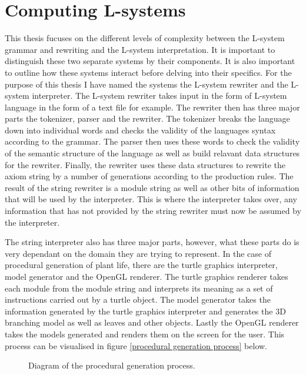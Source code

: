 \section{Computing L-systems}

This thesis fucuses on the different levels of complexity between the L-system grammar and rewriting and the L-system interpretation. It is important to distinguish these two separate systems by their components. It is also important to outline how these systems interact before delving into their specifics. For the purpose of this thesis I have named the systems the L-system rewriter and the L-system interpreter. The L-system rewriter takes input in the form of L-system language in the form of a text file for example. The rewriter then has three major parts the tokenizer, parser and the rewriter. The tokenizer breaks the language down into individual words and checks the validity of the languages syntax according to the grammar. The parser then uses  these words to check the validity of the semantic structure of the language as well as build relavant data structures for the rewriter. Finally, the rewriter uses these data structures to rewrite the axiom string by a number of generations according to the production rules. The result of the string rewriter is a module string as well as other bits of information that will be used by the interpreter. This is where the interpreter takes over, any information that has not provided by the string rewriter must now be assumed by the interpreter. 

The string interpreter also has three major parts, however, what these parts do is very dependant on the domain they are trying to represent. In the case of procedural generation of plant life, there are the turtle graphics interpreter, model generator and the OpenGL renderer. The turtle graphics renderer takes each module from the module string and interprets its meaning as a set of instructions carried out by a turtle object. The model generator takes the information generated by the turtle graphics interpreter and generates the 3D branching model as well as leaves and other objects. Lastly the OpenGL renderer takes the models generated and renders them on the screen for the user. This process can be visualised in figure \ref{procedural generation process} below.

\begin{figure}[htbp]
	{\centering
		\setlength{\fboxrule}{1pt}
		\vspace{7px}
		\caption{Diagram of the procedural generation process.}
	}
\end{figure}
\FloatBarrier

